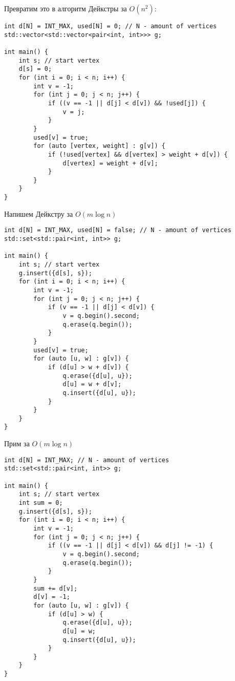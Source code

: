 \documentclass[12pt, a4paper]{article}
\begin{document}
    Превратим это в алгоритм Дейкстры за $O(n^2)$:
    \begin{lstlisting}
int d[N] = INT_MAX, used[N] = 0; // N - amount of vertices
std::vector<std::vector<pair<int, int>>> g;
    
int main() {
    int s; // start vertex
    d[s] = 0;
    for (int i = 0; i < n; i++) {
        int v = -1;
        for (int j = 0; j < n; j++) {
            if ((v == -1 || d[j] < d[v]) && !used[j]) {
                v = j;
            }
        }
        used[v] = true;
        for (auto [vertex, weight] : g[v]) {
            if (!used[vertex] && d[vertex] > weight + d[v]) {
                d[vertex] = weight + d[v];
            }
        }
    }
}
    \end{lstlisting}
    \newpage
    Напишем Дейкстру за $O(m\log n)$
\begin{lstlisting}
int d[N] = INT_MAX, used[N] = false; // N - amount of vertices
std::set<std::pair<int, int>> g;
        
int main() {
    int s; // start vertex
    g.insert({d[s], s});
    for (int i = 0; i < n; i++) {
        int v = -1;
        for (int j = 0; j < n; j++) {
            if (v == -1 || d[j] < d[v]) {
                v = q.begin().second;
                q.erase(q.begin());
            }
        }
        used[v] = true;
        for (auto [u, w] : g[v]) {
            if (d[u] > w + d[v]) {
                q.erase({d[u], u});
                d[u] = w + d[v];
                q.insert({d[u], u});
            }
        }
    }
}
    \end{lstlisting}
    Прим за $O(m\log n)$
    \begin{lstlisting}
int d[N] = INT_MAX; // N - amount of vertices
std::set<std::pair<int, int>> g;
                
int main() {
    int s; // start vertex
    int sum = 0;
    g.insert({d[s], s});
    for (int i = 0; i < n; i++) {
        int v = -1;
        for (int j = 0; j < n; j++) {
            if ((v == -1 || d[j] < d[v]) && d[j] != -1) {
                v = q.begin().second;
                q.erase(q.begin());
            }
        }
        sum += d[v];
        d[v] = -1;
        for (auto [u, w] : g[v]) {
            if (d[u] > w) {
                q.erase({d[u], u});
                d[u] = w;
                q.insert({d[u], u});
            }
        }
    }
}
    \end{lstlisting}
\end{document}
